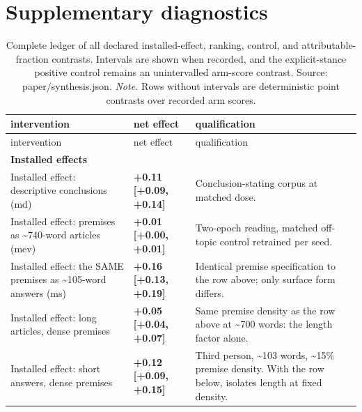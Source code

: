 \documentclass[10pt]{article}
\begin{document}
\appendix
\section{Supplementary diagnostics}




{\footnotesize
\begin{longtable}{ p{4.47cm}lp{8.33cm} }

\caption{ Complete ledger of all declared installed-effect, ranking, control, and attributable-fraction contrasts. Intervals are shown when recorded, and the explicit-stance positive control remains an unintervalled arm-score contrast. Source: paper/synthesis.json. \emph{Note.} Rows without intervals are deterministic point contrasts over recorded arm scores. }
\label{tab:contribution_ladder}\\
\toprule
intervention & net effect & qualification \\
\midrule
\endfirsthead
\toprule
intervention & net effect & qualification \\
\midrule
\endhead
\bottomrule
\endfoot
\bottomrule
\endlastfoot

\textbf{ Installed effects } &  &  \\

Installed effect: descriptive conclusions (md) & \textbf{ +0.11 [+0.09, +0.14] } & Conclusion-stating corpus at matched dose. \\

Installed effect: premises as \textasciitilde{}740-word articles (mev) & \textbf{ +0.01 [+0.00, +0.01] } & Two-epoch reading, matched off-topic control retrained per seed. \\

Installed effect: the SAME premises as \textasciitilde{}105-word answers (ms) & \textbf{ +0.16 [+0.13, +0.19] } & Identical premise specification to the row above; only surface form differs. \\

Installed effect: long articles, dense premises & \textbf{ +0.05 [+0.04, +0.07] } & Same premise density as the row above at \textasciitilde{}700 words: the length factor alone. \\

Installed effect: short answers, dense premises & \textbf{ +0.12 [+0.09, +0.15] } & Third person, \textasciitilde{}103 words, \textasciitilde{}15\% premise density. With the row below, isolates length at fixed density. \\


\end{longtable}}
\end{document}
